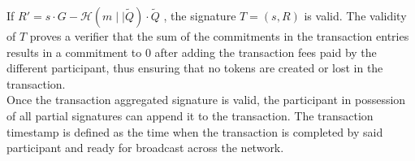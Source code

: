 If $R' = s \cdot G - \mathcal{H}(m \mid\mid \tilde{Q})\cdot \tilde{Q}$ , the signature $T = (s,R)$ is valid. The validity of $T$ proves a verifier that the sum of the commitments in the transaction entries results in a commitment to 0 after adding the transaction fees paid by the different participant, thus ensuring that no tokens are created or lost in the transaction. \\

Once the transaction aggregated signature is valid, the participant in possession of all partial signatures can append it to the transaction. The transaction timestamp is defined as the time when the transaction is completed by said participant and ready for broadcast across the network. 
